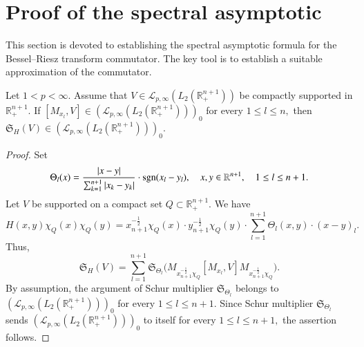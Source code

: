 \documentclass[12pt]{amsart}
\begin{document}
\section{Proof of the spectral asymptotic}\label{spect}
\setcounter{equation}{0}

This section is devoted to establishing the spectral asymptotic formula for the Bessel--Riesz transform commutator. The key tool is to establish a suitable approximation of the commutator.

\begin{lemma}\label{abcde}
Let $1<p<\infty$. Assume that $V\in \mathcal{L}_{p,\infty}(L_2(\mathbb{R}^{n+1}_+))$ be compactly supported in $\mathbb{R}^{n+1}_+.$ If
$[M_{x_l},V]\in (\mathcal{L}_{p,\infty}(L_2(\mathbb{R}^{n+1}_+)))_0$ for every $1\leq l\leq n,$ then $\mathfrak{S}_H(V)\in (\mathcal{L}_{p,\infty}(L_2(\mathbb{R}^{n+1}_+)))_0.$
\end{lemma}
\begin{proof} Set
$$\Theta_l(x)=\frac{|x-y|}{\sum_{k=1}^{n+1}|x_k-y_k|}\cdot {\rm sgn}(x_l-y_l),\quad x,y\in\mathbb{R}^{n+1},\quad 1\leq l\leq n+1.$$
Let $V$ be supported on a compact set $Q\subset \mathbb{R}^{n+1}_+.$ We have
$$H(x,y)\chi_Q(x)\chi_Q(y)=x_{n+1}^{-\frac12}\chi_Q(x)\cdot y_{n+1}^{-\frac12}\chi_Q(y)\cdot  \sum_{l=1}^{n+1}\Theta_l(x,y)\cdot (x-y)_l.$$
Thus,
$$\mathfrak{S}_H(V)=\sum_{l=1}^{n+1}\mathfrak{S}_{\Theta_l}\Big(M_{x_{n+1}^{-\frac12}\chi_Q} [M_{x_l},V] M_{x_{n+1}^{-\frac12}\chi_Q}\Big).$$
By assumption, the argument of Schur multiplier $\mathfrak{S}_{\Theta_l}$ belongs to $(\mathcal{L}_{p,\infty}(L_2(\mathbb{R}^{n+1}_+)))_0$ for every $1\leq l\leq n+1.$ Since Schur multiplier $\mathfrak{S}_{\Theta_l}$ sends $(\mathcal{L}_{p,\infty}(L_2(\mathbb{R}^{n+1}_+)))_0$ to itself for every $1\leq l\leq n+1,$ the assertion follows.
\end{proof}
\end{document}
